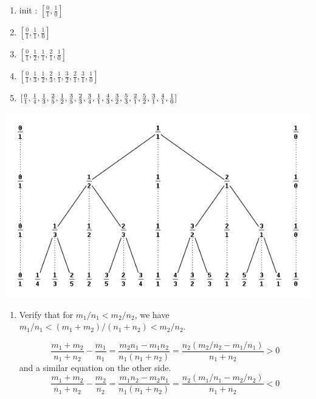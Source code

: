 \documentclass[a4paper,11pt]{exam}
\begin{document}
\begin{questions}
\begin{minipage}{0.4\textwidth}
	\begin{enumerate}[label=\arabic*)]
		\item init : $[\frac{0}{1}, \frac{1}{0}]$
		\item $[\frac{0}{1}, \frac{1}{1}, \frac{1}{0}]$
		\item $[\frac{0}{1}, \frac{1}{2}, \frac{1}{1}, \frac{2}{1}, \frac{1}{0}]$
		\item $[\frac{0}{1}, \frac{1}{3}, \frac{1}{2}, \frac{2}{3},
		\frac{1}{1}, \frac{3}{2}, \frac{2}{1}, \frac{3}{1}, \frac{1}{0}]$
		\item $[\frac{0}{1}, \frac{1}{4}, \frac{1}{3}, \frac{2}{5},
		\frac{1}{2}, \frac{3}{5}, \frac{2}{3}, \frac{3}{4}, \frac{1}{1},
		\frac{4}{3}, \frac{3}{2}, \frac{5}{3}, \frac{2}{1}, \frac{5}{2},\\
		\frac{3}{1}, \frac{4}{1}, \frac{1}{0}]$
	\end{enumerate}
\end{minipage}
\begin{minipage}{0.5\textwidth}
	\begin{center}
		\includegraphics[scale=0.5]{alg_val_han.png}
	\end{center}
\end{minipage}

\begin{enumerate}
	\item Verify that for $m_1/n_1 < m_2/n_2$, we have $m_1/n_1 < (m_1+m_2)/(n_1+n_2) < m_2/n_2$.
	
	\begin{solution}
		\[
		\frac{m_1+m_2}{n_1+n_2}-\frac{m_1}{n_1} = \frac{m_2n_1-m_1n_2}{n_1(n_1+n_2)} =
		\frac{n_2(m_2/n_2-m_1/n_1)}{n_1+n_2} > 0
		\]
		and a similar equation on the other side.
		\[
		\frac{m_1+m_2}{n_1+n_2}-\frac{m_2}{n_2} = \frac{m_1n_2-m_2n_1}{n_1(n_1+n_2)} =
		\frac{n_2(m_1/n_1-m_2/n_2)}{n_1+n_2} < 0
		\]
		

\end{solution}
\end{enumerate}
\end{questions}
\end{document}
